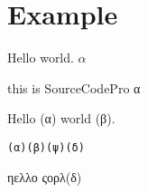 \documentclass[12pt,twoside]{reedthesis}
\begin{document}
\chapter{Example}


Hello world.
$α$

\textsf{\SourceCodePro this is SourceCodePro α}

Hello {\SourceCodePro (α)} world {\SourceCodePro (β)}.

\begin{lstlisting}[extendedchars=false, basicstyle={\SourceCodePro}, fontadjust=false]
  (α)(β)(ψ)(δ)
\end{lstlisting}

\begin{program}
  ηελλο ςορλ(δ)
\end{program}

\end{document}
